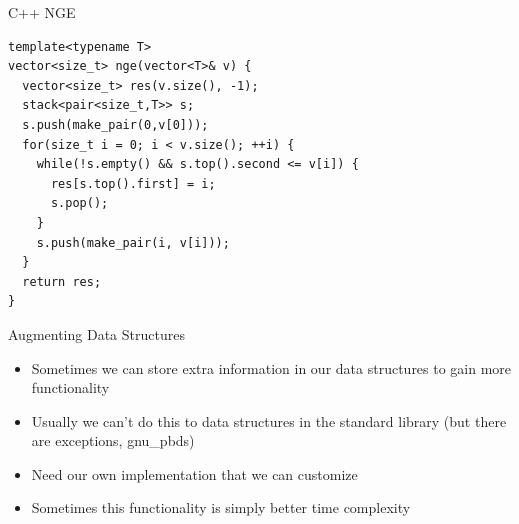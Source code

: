 \documentclass{beamer}
\begin{document}

\begin{frame}
\end{frame}

\begin{frame}{C++ NGE}
    \begin{verbatim}
template<typename T>
vector<size_t> nge(vector<T>& v) {
  vector<size_t> res(v.size(), -1);
  stack<pair<size_t,T>> s; 
  s.push(make_pair(0,v[0]));
  for(size_t i = 0; i < v.size(); ++i) {
    while(!s.empty() && s.top().second <= v[i]) {
      res[s.top().first] = i; 
      s.pop(); 
    }
    s.push(make_pair(i, v[i])); 
  }
  return res; 
}
    \end{verbatim}
\end{frame}


\begin{frame}[plain]{Augmenting Data Structures}
    \begin{itemize}
        \item Sometimes we can store extra information in our data structures to gain more functionality
        \item Usually we can't do this to data structures in the standard library (but there are exceptions, gnu\_pbds)
        \item Need our own implementation that we can customize
        \item Sometimes this functionality is simply better time complexity
    \end{itemize}
\end{frame}
\end{document}
